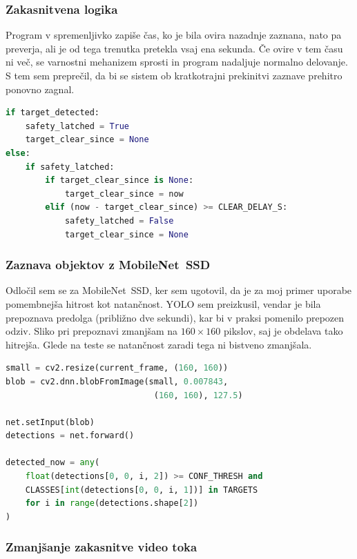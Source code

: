 \documentclass[12pt]{article}
\begin{document}
\subsubsection{Zakasnitvena logika}

Program v spremenljivko zapiše čas, ko je bila ovira nazadnje zaznana,
nato pa preverja, ali je od tega trenutka pretekla vsaj ena sekunda.
Če ovire v tem času ni več, se varnostni mehanizem sprosti in program
nadaljuje normalno delovanje. S tem sem preprečil, da bi se sistem ob
kratkotrajni prekinitvi zaznave prehitro ponovno zagnal.

\begin{lstlisting}[language=Python,
  caption={1-sekundni zamik pri ponovni sprostitvi varnostne
    zaustavitve.}]
if target_detected:
    safety_latched = True
    target_clear_since = None
else:
    if safety_latched:
        if target_clear_since is None:
            target_clear_since = now
        elif (now - target_clear_since) >= CLEAR_DELAY_S:
            safety_latched = False
            target_clear_since = None
\end{lstlisting}

\subsubsection{Zaznava objektov z MobileNet~SSD}

Odločil sem se za MobileNet~SSD, ker sem
ugotovil, da je za moj primer uporabe pomembnejša hitrost kot natančnost. YOLO sem preizkusil, vendar je bila prepoznava predolga
(približno dve sekundi), kar bi v praksi pomenilo prepozen odziv.
Sliko pri prepoznavi zmanjšam na $160 \times 160$ pikslov, saj je
obdelava tako hitrejša. Glede na teste se natančnost zaradi tega ni bistveno zmanjšala.

\begin{lstlisting}[language=Python,
  caption={Zaznavanje tarč z MobileNet~SSD.}]
small = cv2.resize(current_frame, (160, 160))
blob = cv2.dnn.blobFromImage(small, 0.007843,
                              (160, 160), 127.5)

net.setInput(blob)
detections = net.forward()

detected_now = any(
    float(detections[0, 0, i, 2]) >= CONF_THRESH and
    CLASSES[int(detections[0, 0, i, 1])] in TARGETS
    for i in range(detections.shape[2])
)
\end{lstlisting}

\subsubsection{Zmanjšanje zakasnitve video toka}
\end{document}
